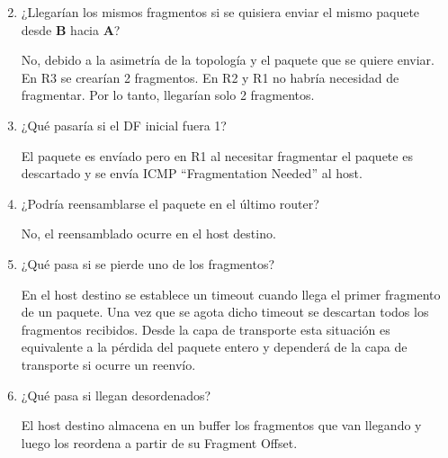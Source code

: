 \begin{enumerate}[left=0cm]
    \setcounter{enumi}{1}
    \renewcommand{\arraystretch}{1.5}
    \item ¿Llegarían los mismos fragmentos si se quisiera enviar el mismo paquete desde \textbf{B} hacia \textbf{A}?
    
    No, debido a la asimetría de la topología y el paquete que se quiere enviar. En R3 se crearían 2 fragmentos. En R2 y R1 no habría necesidad de fragmentar. Por lo tanto, llegarían solo 2 fragmentos.
        
    \item ¿Qué pasaría si el DF inicial fuera 1?
    
    El paquete es envíado pero en R1 al necesitar fragmentar el paquete es descartado y se envía ICMP ``Fragmentation Needed'' al host.

    \item ¿Podría reensamblarse el paquete en el último router?

    No, el reensamblado ocurre en el host destino.

    \item ¿Qué pasa si se pierde uno de los fragmentos?

    En el host destino se establece un timeout cuando llega el primer fragmento de un paquete. Una vez que se agota dicho timeout se descartan todos los fragmentos recibidos. Desde la capa de transporte esta situación es equivalente a la pérdida del paquete entero y dependerá de la capa de transporte si ocurre un reenvío.

    \item ¿Qué pasa si llegan desordenados?
    
    El host destino almacena en un buffer los fragmentos que van llegando y luego los reordena a partir de su Fragment Offset.
\end{enumerate}
